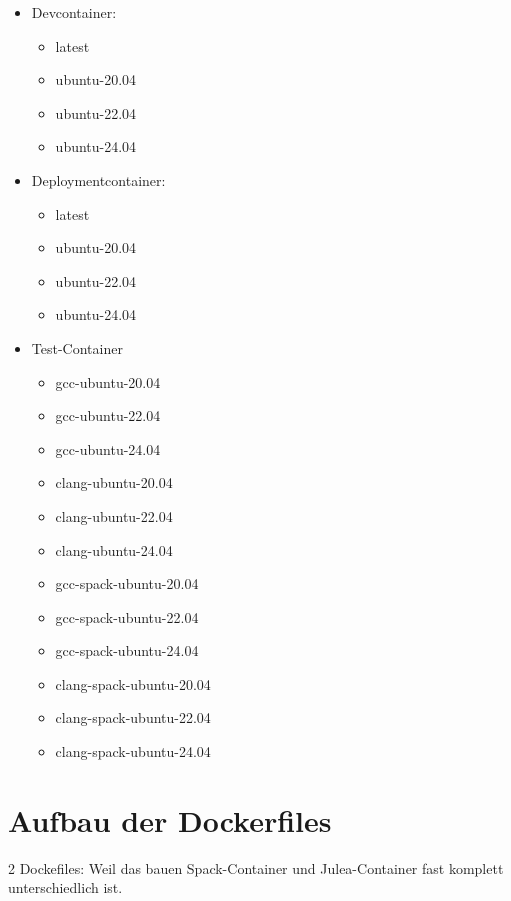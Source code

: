 \begin{itemize}
    \item Devcontainer: 
    
    \begin{itemize}
        \item latest
        \item ubuntu-20.04
        \item ubuntu-22.04
        \item ubuntu-24.04
    \end{itemize}
    
    \item Deploymentcontainer: 
    \begin{itemize}
        \item latest
        \item ubuntu-20.04
        \item ubuntu-22.04
        \item ubuntu-24.04
    \end{itemize}
    
    \item Test-Container 
    \begin{itemize}
        \item gcc-ubuntu-20.04
        \item gcc-ubuntu-22.04
        \item gcc-ubuntu-24.04
        \item clang-ubuntu-20.04
        \item clang-ubuntu-22.04
        \item clang-ubuntu-24.04
        \item gcc-spack-ubuntu-20.04
        \item gcc-spack-ubuntu-22.04
        \item gcc-spack-ubuntu-24.04
        \item clang-spack-ubuntu-20.04
        \item clang-spack-ubuntu-22.04
        \item clang-spack-ubuntu-24.04
    \end{itemize}
    

\end{itemize}

\section{Aufbau der Dockerfiles}

2 Dockefiles: Weil das bauen Spack-Container und Julea-Container fast komplett unterschiedlich ist.

